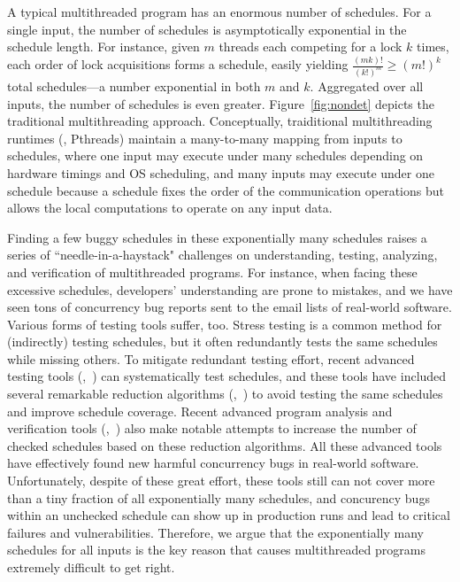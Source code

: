 A typical multithreaded program has an enormous number of schedules.  For
a single input, the number of schedules is asymptotically exponential in
the schedule length.  For instance, given $m$ threads each competing for a
lock $k$ times, each order of lock acquisitions forms a schedule, easily
yielding $\frac{(mk)!}{(k!)^m} \ge (m!)^k$ total schedules---a number
exponential in both $m$ and $k$. Aggregated over all inputs, the number of
schedules is even greater. Figure~\ref{fig:nondet} depicts the traditional
multithreading approach. Conceptually, traiditional multithreading runtimes
(\eg, Pthreads) maintain a many-to-many mapping from inputs to schedules, where
one input may execute under many schedules depending on hardware timings and OS
scheduling, and many inputs may execute under one schedule because a schedule
fixes the order of the communication operations but allows the local
computations to operate on any input data.

Finding a few buggy schedules in these exponentially many schedules raises
a series of ``needle-in-a-haystack" challenges on understanding, testing,
analyzing, and verification of multithreaded programs. For instance, when facing
these excessive schedules, developers' understanding are prone to mistakes, and
we have seen tons of concurrency bug reports sent to the email lists of
real-world software. Various forms of testing tools suffer, too.  Stress testing
is a common method for (indirectly) testing schedules, but it often redundantly
tests the same schedules while missing others. To mitigate redundant testing
effort, recent advanced testing tools (\eg,~\cite{musuvathi:chess:osdi08,
modist:nsdi09, dbug:ssv10, demeter:sosp11}) can systematically test schedules,
and these tools have included several remarkable reduction algorithms
(\eg,~\cite{flanagan:dynamicpo, demeter:sosp11}) to avoid testing the same
schedules and improve schedule coverage. Recent advanced program
analysis and verification tools (\eg,~\cite{demeter:sosp11}) also make notable
attempts to increase the number of checked schedules based on these reduction
algorithms. All these advanced tools have effectively found new harmful
concurrency bugs in real-world software. Unfortunately, despite of these great
effort, these tools still can not cover more than a tiny fraction of all
exponentially many schedules, and concurency bugs within an unchecked schedule
can show up in production runs and lead to critical failures and
vulnerabilities. Therefore, we argue that the exponentially many schedules for
all inputs is the key reason that causes multithreaded programs extremely
difficult to get right.


